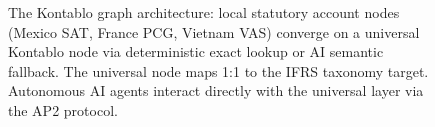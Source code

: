 \begin{figure}[ht]
{%
}
\caption{The Kontablo graph architecture: local statutory account nodes
(Mexico SAT, France PCG, Vietnam VAS) converge on a universal Kontablo
node via deterministic exact lookup or AI semantic fallback. The universal
node maps 1:1 to the IFRS taxonomy target. Autonomous AI agents interact
directly with the universal layer via the AP2 protocol.}
\label{fig:kontablo_graph_architecture}
\end{figure}
